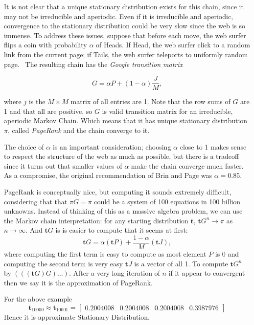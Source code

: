 It is not clear that a unique stationary distribution exists for this chain, 
since it may not be irreducible and aperiodic. 
Even if it is irreducible and aperiodic, convergence
to the stationary distribution could be very slow since the web is so immense. To
address these issues, suppose that before each move, the web surfer flips a coin
with probability $ \alpha $ of Heads. If Head, the web surfer click to a random 
link from the current page; if Tails, the web surfer teleports to uniformly random 
page. \ The resulting chain has the \textit{Google transition matrix}

\begin{equation}
    \label{google transition matrix}
    G = \alpha P + (1-\alpha) \frac{J}{M},
\end{equation}

where $ j $ is the  $ M\times M $ matrix of all entries are 1. Note that the row sums 
of $ G $ are 1 and that all are positive, so  $ G$ is valid transition matrix for an 
irreducible, aperiodic Markov Chain. Which means that it has unique stationary 
distribution $ \pi $, called \textit{PageRank} and the chain converge to it.
 
The choice of $\alpha$ is an important consideration; 
choosing $ \alpha $ close to 1 makes sense to respect the structure of the
web as much as possible, but there is a tradeoff since it turns out that smaller
values of $ \alpha $ make the chain converge much faster. 
As a compromise, the original recommendation of Brin and Page was $\alpha = 0.85$.

PageRank is conceptually nice, but computing it sounds extremely difficult, considering
that that $ \pi G=\pi $ could be a system of 100 equations in 100 billion unknowns.
Instead of thinking of this as a massive algebra problem, we can use the Markov
chain interpretation: for any starting distribution  $ \mathbf{t} $,  
$\mathbf{t}G^{n}\to \pi$ as $ n\to\infty $. And $ \mathbf{t}G $ is is easier to 
compute that it seems at first:
 \[
     \mathbf{t}G = \alpha(\mathbf{t}P) +\frac{1-\alpha}{M}(\mathbf{t}J),
\]
where computing the first term is easy to compute as most element $ P $  is 0 and 
computing the second term is very easy $ \mathbf{t}J $ is a vector of all 1. 
To compute $ \mathbf{t}G^{n} $ by $ (((\mathbf{t}G)G)\ldots) $. After a very long 
iteration of $ n $ if it appear to convergent then we say  it is the approximation
of PageRank.

For the above example 
\[
    \mathbf{t}_{10000}\approx\mathbf{t}_{10001} = 
    \begin{bmatrix}
        0.2004008 & 0.2004008 & 0.2004008 & 0.3987976 
    \end{bmatrix} 
\]
Hence it is approximate Stationary Distribution.

